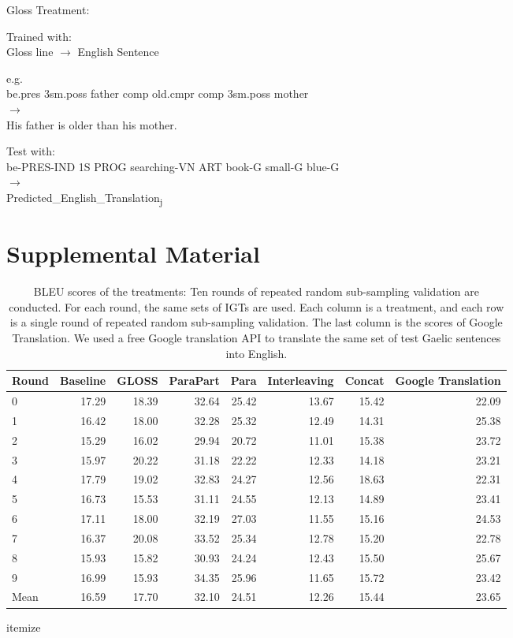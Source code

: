 \documentclass[a4paper]{article}
\begin{document}
\begin{exe}  
\ex Gloss Treatment: 
\begin{xlist}
	\ex Trained with:\\
	 Gloss line $\rightarrow$ English Sentence 
	\begin{xlist}
		\ex e.g. \\
			be.pres 3sm.poss father comp old.cmpr comp 3sm.poss mother \\
			$\rightarrow$ \\
			His father is older than his mother.
	\end{xlist}
	\ex Test with:\\
		be-PRES-IND 1S PROG searching-VN ART book-G small-G blue-G\\
		$\rightarrow$ \\
		Predicted\_English\_Translation\textsubscript{j}
\end{xlist}
\end{exe}




\appendix
\newpage
\section{Supplemental Material}
\begin{table}[ht]
\centering
\begin{tabular}{lrrrrrrr}
  \hline
Round & Baseline & GLOSS & ParaPart & Para & Interleaving & Concat & Google Translation \\ 
  \hline
0 & 17.29 & 18.39 & 32.64 & 25.42 & 13.67 & 15.42 & 22.09 \\ 
  1 & 16.42 & 18.00 & 32.28 & 25.32 & 12.49 & 14.31 & 25.38 \\ 
  2 & 15.29 & 16.02 & 29.94 & 20.72 & 11.01 & 15.38 & 23.72 \\ 
  3 & 15.97 & 20.22 & 31.18 & 22.22 & 12.33 & 14.18 & 23.21 \\ 
  4 & 17.79 & 19.02 & 32.83 & 24.27 & 12.56 & 18.63 & 22.31 \\ 
  5 & 16.73 & 15.53 & 31.11 & 24.55 & 12.13 & 14.89 & 23.41 \\ 
  6 & 17.11 & 18.00 & 32.19 & 27.03 & 11.55 & 15.16 & 24.53 \\ 
  7 & 16.37 & 20.08 & 33.52 & 25.34 & 12.78 & 15.20 & 22.78 \\ 
  8 & 15.93 & 15.82 & 30.93 & 24.24 & 12.43 & 15.50 & 25.67 \\ 
  9 & 16.99 & 15.93 & 34.35 & 25.96 & 11.65 & 15.72 & 23.42 \\ 
   \hline
Mean & 16.59 & 17.70 & 32.10 & 24.51 & 12.26 & 15.44 & 23.65 \\ 
   \hline
\end{tabular}
\caption{BLEU scores of the treatments: Ten rounds of repeated random sub-sampling validation are conducted. For each round, the same sets of IGTs are used. Each column is a treatment, and each row is a single round of repeated random sub-sampling validation. The last column is the scores of Google Translation. We used a free Google translation API \citep{google_api} to translate the same set of test Gaelic sentences into English.} 
\label{table:complete_table}
\end{table}itemize
\end{document}
